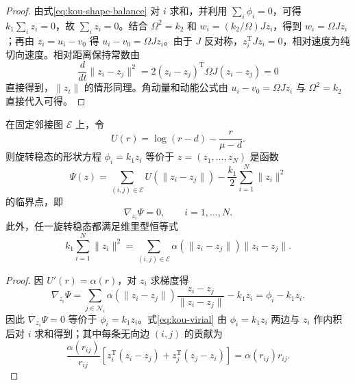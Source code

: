 \begin{proof}
由式\eqref{eq:kou-shape-balance} 对 $i$ 求和，并利用 $\sum_i\phi_i=0$，可得 $k_1\sum_i z_i=0$，故 $\sum_i z_i=0$。结合 $\Omega^2=k_2$ 和 $w_i=(k_2/\Omega)Jz_i$，得到 $w_i=\Omega Jz_i$；再由 $\dot{z}_i=u_i-v_0$ 得 $u_i-v_0=\Omega Jz_i$。由于 $J$ 反对称，$z_i^\mathrm{T}Jz_i=0$，相对速度为纯切向速度。相对距离保持常数由
\begin{equation}
\frac{d}{dt}\|z_i-z_j\|^2
=2(z_i-z_j)^\mathrm{T}\Omega J(z_i-z_j)=0
\end{equation}
直接得到，$\|z_i\|$ 的情形同理。角动量和动能公式由 $u_i-v_0=\Omega Jz_i$ 与 $\Omega^2=k_2$ 直接代入可得。
\end{proof}

\begin{theorem}[形状方程的能量型刻画]
在固定邻接图 $\mathcal{E}$ 上，令
\begin{equation}
U(r)=\log(r-d)-\frac{r}{\mu-d}.
\end{equation}
则旋转稳态的形状方程 $\phi_i=k_1z_i$ 等价于 $z=(z_1,\ldots,z_N)$ 是函数
\begin{equation}
\Psi(z)=\sum_{(i,j)\in\mathcal{E}}U(\|z_i-z_j\|)
-\frac{k_1}{2}\sum_{i=1}^N\|z_i\|^2
\end{equation}
的临界点，即
\begin{equation}
\nabla_{z_i}\Psi=0,\qquad i=1,\ldots,N .
\end{equation}
此外，任一旋转稳态都满足维里型恒等式
\begin{equation}
k_1\sum_{i=1}^N\|z_i\|^2
=\sum_{(i,j)\in\mathcal{E}}\alpha(\|z_i-z_j\|)\|z_i-z_j\| . \label{eq:kou-virial}
\end{equation}
\end{theorem}

\begin{proof}
因 $U'(r)=\alpha(r)$，对 $z_i$ 求梯度得
\begin{equation}
\nabla_{z_i}\Psi
=\sum_{j\in\mathcal{N}_i}\alpha(\|z_i-z_j\|)
\frac{z_i-z_j}{\|z_i-z_j\|}-k_1z_i
=\phi_i-k_1z_i .
\end{equation}
因此 $\nabla_{z_i}\Psi=0$ 等价于 $\phi_i=k_1z_i$。式\eqref{eq:kou-virial} 由 $\phi_i=k_1z_i$ 两边与 $z_i$ 作内积后对 $i$ 求和得到；其中每条无向边 $(i,j)$ 的贡献为
\begin{equation}
\frac{\alpha(r_{ij})}{r_{ij}}
\left[z_i^\mathrm{T}(z_i-z_j)+z_j^\mathrm{T}(z_j-z_i)\right]
=\alpha(r_{ij})r_{ij}.
\end{equation}
\end{proof}

